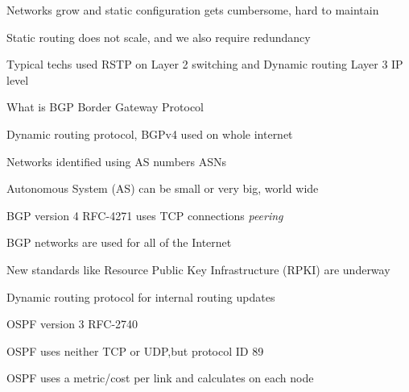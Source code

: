 \documentclass[Screen16to9,17pt]{foils}
\begin{document}

\begin{list1}
\item Networks grow and static configuration gets cumbersome, hard to maintain
\item Static routing does not scale, and we also require redundancy
\item Typical techs used RSTP on Layer 2 switching and Dynamic routing Layer 3 IP level
\end{list1}



\begin{list1}
\item What is BGP Border Gateway Protocol
\item Dynamic routing protocol, BGPv4 used on whole internet
\item Networks identified using AS numbers ASNs
\item Autonomous System (AS) can be small or very big, world wide
\item BGP version 4 RFC-4271 uses TCP connections
\emph{peering}
\item {}
\end{list1}




\begin{list2}
\item BGP networks are used for all of the Internet
\item New standards like Resource Public Key Infrastructure (RPKI) are underway
\end{list2}




\begin{list2}
\item Dynamic routing protocol for internal routing updates
\item OSPF version 3 RFC-2740
\item OSPF uses neither TCP or UDP,but protocol ID 89
\item OSPF uses a metric/cost per link and calculates on each node
\item {}
\end{list2}
\end{document}
